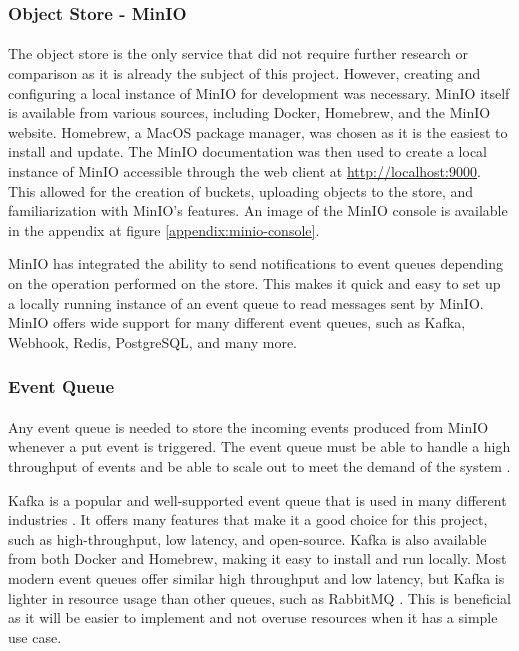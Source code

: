 \documentclass[12pt, conference, final, a4paper, onecolumn, compsoc]{IEEEtran}
\begin{document}
\subsubsection*{Object Store - MinIO}
\paragraph{}

The object store is the only service that did not require further research or
comparison as it is already the subject of this project. However, creating and
configuring a local instance of MinIO for development was necessary. MinIO
itself is available from various sources, including Docker, Homebrew, and the
MinIO website. Homebrew, a MacOS package manager, was chosen as it is the
easiest to install and update. The MinIO documentation was then used to create a
local instance of MinIO accessible through the web client
at \url{http://localhost:9000}. This allowed for the creation of buckets,
uploading objects to the store, and familiarization with MinIO's features. An
image of the MinIO console is available in the appendix at figure
\ref{appendix:minio-console}.


MinIO has integrated the ability to send notifications to event queues depending
on the operation performed on the store. This makes it quick and easy to set up
a locally running instance of an event queue to read messages sent by MinIO.
MinIO offers wide support for many different event queues, such as Kafka,
Webhook, Redis, PostgreSQL, and many more.

\subsubsection*{Event Queue}
\paragraph{}

Any event queue is needed to store the incoming events produced from MinIO
whenever a put event is triggered. The event queue must be able to handle a high
throughput of events and be able to scale out to meet the demand of the system
\citep{event-driven-arch}.

Kafka is a popular and well-supported event queue that is used in many different
industries \citep{event-driven-arch}. It offers many features that make it a
good choice for this project, such as high-throughput, low latency, and
open-source. Kafka is also available from both Docker and Homebrew, making it
easy to install and run locally. Most modern event queues offer similar high
throughput and low latency, but Kafka is lighter in resource usage than other
queues, such as RabbitMQ \citep{kafka-rabbitmq}. This is beneficial as it will
be easier to implement and not overuse resources when it has a simple use case.
\end{document}

